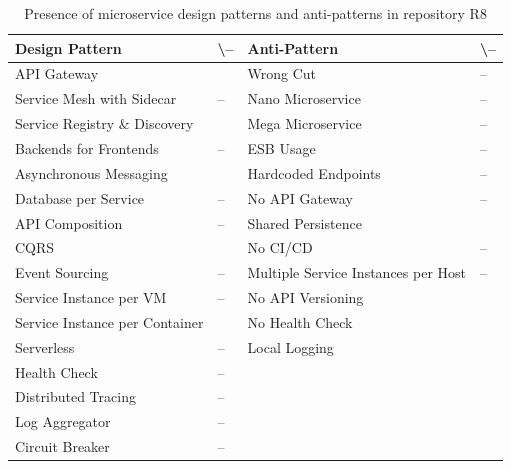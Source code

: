 \documentclass{Configuration_Files/PoliMi3i_thesis}
\newcommand{\cmark}{\ding{51}}%
\begin{document}
\begin{table}[H]
\centering 
    \begin{tabular}{ 
  | >{\centering\arraybackslash} m{16em} 
  | >{\centering\arraybackslash} m{2.2em} 
  | >{\centering\arraybackslash} m{16em} 
  | >{\centering\arraybackslash} m{2.2em} | }
    \hline
    \rowcolor{bluepoli!40}
    \textbf{Design Pattern} & \cmark \textbackslash – & \textbf{Anti-Pattern} & \cmark \textbackslash – \T\B \\
    \hline \hline
    API Gateway & \cmark & Wrong Cut & – \T\B\\
    \hline
    \rowcolor{bluepoli!10}
    Service Mesh with Sidecar & – & Nano Microservice & – \T\B \\
    \hline
    Service Registry \& Discovery & \cmark & Mega Microservice & – \T\B \\
    \hline
    \rowcolor{bluepoli!10}
    Backends for Frontends & – & ESB Usage & – \T\B \\
    \hline
    Asynchronous Messaging & \cmark & Hardcoded Endpoints & – \T\B \\
    \hline
    \rowcolor{bluepoli!10}
    Database per Service & – & No API Gateway & – \T\B \\
    \hline
    API Composition & – & Shared Persistence & \cmark \T\B \\
    \hline
    \rowcolor{bluepoli!10}
    CQRS & \cmark & No CI/CD & – \T\B \\
    \hline
    Event Sourcing & – & Multiple Service Instances per Host & – \T\B \\
    \hline
    \rowcolor{bluepoli!10}
    Service Instance per VM & – & No API Versioning & \cmark \T\B \\
    \hline
    Service Instance per Container & \cmark & No Health Check & \cmark \T\B \\
    \hline
    \rowcolor{bluepoli!10}
    Serverless & – & Local Logging & \cmark \T\B \\
    \hline
    Health Check & – &  & \T\B \\
    \hline
    \rowcolor{bluepoli!10}
    Distributed Tracing & – & & \T\B \\
    \hline
    Log Aggregator & – &  & \T\B \\
    \hline
    \rowcolor{bluepoli!10}
    Circuit Breaker & – &  & \T\B \\
    \hline
    \end{tabular}
    \\[10pt]
    \caption{Presence of microservice design patterns and anti-patterns in repository R8}
    \label{table:R8_result}
\end{table}
\end{document}
